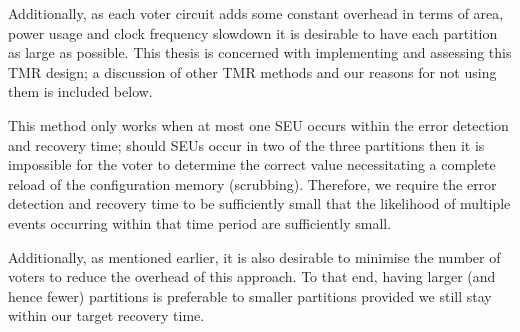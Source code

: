 \documentclass[12pt,final,oneside]{dwThesis} %
\begin{document}
   Additionally, as each voter circuit adds some constant overhead in terms of
   area, power usage and clock frequency slowdown it is desirable to have each
   partition as large as possible. This thesis is concerned with implementing
   and assessing this \gls{TMR} design; a discussion of other \gls{TMR} methods
   and our reasons for not using them is included below.

   This method only works when at most one \gls{SEU} occurs within the error
   detection and recovery time; should \glspl{SEU} occur in two of the three
   partitions then it is impossible for the voter to determine the correct
   value necessitating a complete reload of the configuration memory
   (\gls{scrubbing}). Therefore, we require the error detection and recovery
   time to be sufficiently small that the likelihood of multiple events
   occurring within that time period are sufficiently small.

   Additionally, as mentioned earlier, it is also desirable to minimise the
   number of voters to reduce the overhead of this approach. To that end,
   having larger (and hence fewer) partitions is preferable to smaller
   partitions provided we still stay within our target recovery time.

\end{document}
